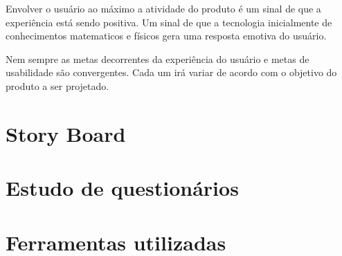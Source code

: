	Envolver o usuário ao máximo a atividade do produto é um sinal de que a experiência está sendo positiva. Um sinal de que a tecnologia inicialmente de conhecimentos matematicos e físicos gera uma resposta emotiva do usuário. 

	Nem sempre as metas decorrentes da experiência do usuário e metas de usabilidade são convergentes. Cada um irá variar de acordo com o objetivo do produto a ser projetado.   



\section{Story Board} %
\label{sec:story_board}


\section{Estudo de questionários} %
\label{sec:estudo_de_question_rios}



\section{Ferramentas utilizadas} %
\label{sec:ferramentas_utilizadas}

